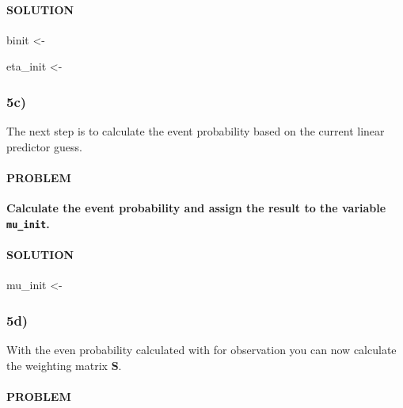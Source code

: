\documentclass[
]{article}
\newenvironment{Shaded}{\begin{snugshade}}{\end{snugshade}}
\newcommand{\NormalTok}[1]{#1}
\newcommand{\StringTok}[1]{\textcolor[rgb]{0.31,0.60,0.02}{#1}}
\begin{document}
\hypertarget{solution-23}{%
\paragraph{SOLUTION}\label{solution-23}}

\begin{Shaded}
\begin{Highlighting}[]
\NormalTok{binit <-}\StringTok{ }

\NormalTok{eta_init <-}\StringTok{ }
\end{Highlighting}
\end{Shaded}

\hypertarget{c-4}{%
\subsubsection{5c)}\label{c-4}}

The next step is to calculate the event probability based on the current
linear predictor guess.

\hypertarget{problem-25}{%
\paragraph{PROBLEM}\label{problem-25}}

\textbf{Calculate the event probability and assign the result to the
variable \texttt{mu\_init}.}

\hypertarget{solution-24}{%
\paragraph{SOLUTION}\label{solution-24}}

\begin{Shaded}
\begin{Highlighting}[]
\NormalTok{mu_init <-}\StringTok{ }
\end{Highlighting}
\end{Shaded}

\hypertarget{d-4}{%
\subsubsection{5d)}\label{d-4}}

With the even probability calculated with for observation you can now
calculate the weighting matrix \(\mathbf{S}\).

\hypertarget{problem-26}{%
\paragraph{PROBLEM}\label{problem-26}}
\end{document}
